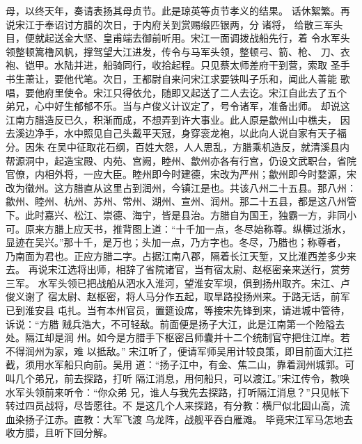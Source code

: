 母，以终天年，奏请表扬其母贞节。此是琼英等贞节孝义的结果。
话休絮繁。再说宋江于奉诏讨方腊的次日，于内府关到赏赐缎匹银两，分诸将，
给散三军头目，便就起送金大坚、皇甫端去御前听用。宋江一面调拨战船先行，着
令水军头领整顿篙橹风帆，撑驾望大江进发，传令与马军头领，整顿弓、箭、枪、
刀、衣袍、铠甲。水陆并进，船骑同行，收拾起程。只见蔡太师差府干到营，索取
圣手书生萧让，要他代笔。次日，王都尉自来问宋江求要铁叫子乐和，闻此人善能
歌唱，要他府里使令。宋江只得依允，随即又起送了二人去讫。宋江自此去了五个
弟兄，心中好生郁郁不乐。当与卢俊义计议定了，号令诸军，准备出师。
却说这江南方腊造反已久，积渐而成，不想弄到许大事业。此人原是歙州山中樵夫，
因去溪边净手，水中照见自己头戴平天冠，身穿衮龙袍，以此向人说自家有天子福
分。因朱在吴中征取花石纲，百姓大怨，人人思乱，方腊乘机造反，就清溪县内
帮源洞中，起造宝殿、内苑、宫阙，睦州、歙州亦各有行宫，仍设文武职台，省院
官僚，内相外将，一应大臣。睦州即今时建德，宋改为严州；歙州即今时婺源，宋
改为徽州。这方腊直从这里占到润州，今镇江是也。共该八州二十五县。那八州：
歙州、睦州、杭州、苏州、常州、湖州、宣州、润州。那二十五县，都是这八州管
下。此时嘉兴、松江、崇德、海宁，皆是县治。方腊自为国王，独霸一方，非同小
可。原来方腊上应天书，推背图上道：“十千加一点，冬尽始称尊。纵横过浙水，
显迹在吴兴。”那十千，是万也；头加一点，乃方字也。冬尽，乃腊也；称尊者，
乃南面为君也。正应方腊二字。占据江南八郡，隔着长江天堑，又比淮西差多少来
去。
再说宋江选将出师，相辞了省院诸官，当有宿太尉、赵枢密亲来送行，赏劳三军。
水军头领已把战船从泗水入淮河，望淮安军坝，俱到扬州取齐。宋江、卢俊义谢了
宿太尉、赵枢密，将人马分作五起，取旱路投扬州来。于路无话，前军已到淮安县
屯扎。当有本州官员，置筵设席，等接宋先锋到来，请进城中管待，诉说：“方腊
贼兵浩大，不可轻敌。前面便是扬子大江，此是江南第一个险隘去处。隔江却是润
州。如今是方腊手下枢密吕师囊并十二个统制官守把住江岸。若不得润州为家，难
以抵敌。”
宋江听了，便请军师吴用计较良策，即目前面大江拦截，须用水军船只向前。吴用
道：“扬子江中，有金、焦二山，靠着润州城郭。可叫几个弟兄，前去探路，打听
隔江消息，用何船只，可以渡江。”宋江传令，教唤水军头领前来听令：“你众弟
兄，谁人与我先去探路，打听隔江消息？”只见帐下转过四员战将，尽皆愿往。不
是这几个人来探路，有分教：横尸似北固山高，流血染扬子江赤。直教：大军飞渡
乌龙阵，战舰平吞白雁滩。
毕竟宋江军马怎地去收方腊，且听下回分解。